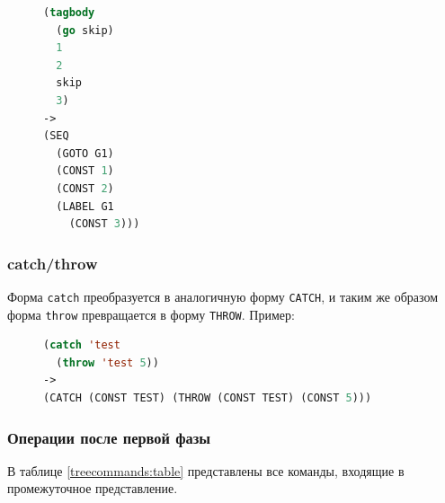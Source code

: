 \begin{figure}[H]
\begin{lstlisting}[language=Lisp]
(tagbody
  (go skip)
  1
  2
  skip
  3)
->
(SEQ
  (GOTO G1)
  (CONST 1)
  (CONST 2)
  (LABEL G1
    (CONST 3)))
\end{lstlisting}
\end{figure}

\subsubsection{catch/throw}

Форма \texttt{catch} преобразуется в аналогичную форму \texttt{CATCH}, и таким же образом форма \texttt{throw} превращается в форму \texttt{THROW}. Пример:

\begin{figure}[H]
\begin{lstlisting}[language=Lisp]
(catch 'test
  (throw 'test 5))
->
(CATCH (CONST TEST) (THROW (CONST TEST) (CONST 5)))
\end{lstlisting}
\end{figure}

\subsubsection{Операции после первой фазы}

В таблице \ref{treecommands:table} представлены все команды, входящие в промежуточное представление.


